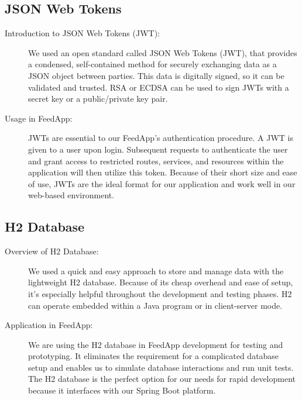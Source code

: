 \subsection{JSON Web Tokens}
\begin{description}
 \item[Introduction to JSON Web Tokens (JWT):]
We used an open standard called JSON Web Tokens (JWT), that provides a condensed, self-contained method for securely exchanging data as a JSON object between parties. This data is digitally signed, so it can be validated and trusted. RSA or ECDSA can be used to sign JWTs with a secret key or a public/private key pair.

 \item[Usage in FeedApp:]
JWTs are essential to our FeedApp's authentication procedure. A JWT is given to a user upon login. Subsequent requests to authenticate the user and grant access to restricted routes, services, and resources within the application will then utilize this token. Because of their short size and ease of use, JWTs are the ideal format for our application and work well in our web-based environment.
\end{description}

\subsection{H2 Database}
\begin{description}
 \item[Overview of H2 Database:]
We used a quick and easy approach to store and manage data with the lightweight H2 database. Because of its cheap overhead and ease of setup, it's especially helpful throughout the development and testing phases. H2 can operate embedded within a Java program or in client-server mode.

 \item[Application in FeedApp:]
We are using the H2 database in FeedApp development for testing and prototyping. It eliminates the requirement for a complicated database setup and enables us to simulate database interactions and run unit tests. The H2 database is the perfect option for our needs for rapid development because it interfaces with our Spring Boot platform.
\end{description}

